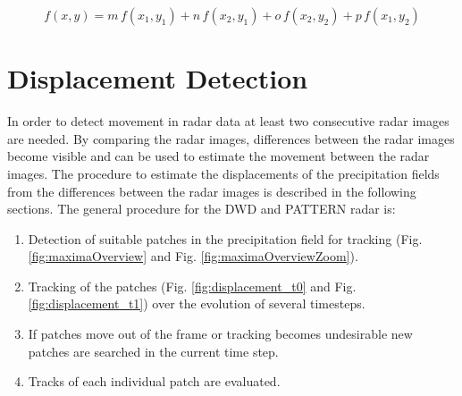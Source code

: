 \documentclass[11pt,twoside,a4paper,fleqn,x11names]{report}
\numberwithin{equation}{chapter}
\numberwithin{figure}{chapter}
\numberwithin{table}{chapter}
\begin{document}
\begin{equation}
	f(x,y) = m\,f(x_1,y_1)+n\,f(x_2,y_1)+o\,f(x_2,y_2)+p\,f(x_1,y_2)
	\label{eq:bilinear}
\end{equation}
\section{Displacement Detection}
\label{subsec:disdetect}
In order to detect movement in radar data at least two consecutive radar images are needed. By comparing the radar images, differences between the radar images become visible and can be used to estimate the movement between the radar images. The procedure to estimate the displacements of the precipitation fields from the differences between the radar images is described in the following sections. The general procedure for the DWD and PATTERN radar is:
\begin{enumerate}
	\item Detection of suitable patches in the precipitation field for tracking (Fig. \ref{fig:maximaOverview} and Fig. \ref{fig:maximaOverviewZoom}).
	\item Tracking of the patches (Fig. \ref{fig:displacement_t0} and Fig. \ref{fig:displacement_t1}) over the evolution of several timesteps.
	\item If patches move out of the frame or tracking becomes undesirable new patches are searched in the current time step.
	\item Tracks of each individual patch are evaluated.
\end{enumerate}

\end{document}

